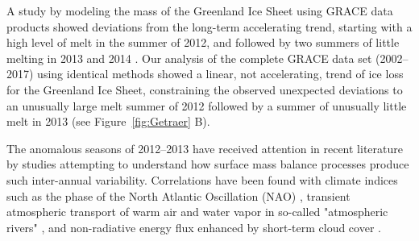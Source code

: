 \documentclass[11pt]{report}
\begin{document}

A study by \cite{Harig+2016} modeling the mass of the Greenland Ice Sheet
using GRACE data products showed deviations from the long-term accelerating
trend, starting with a high level of melt in the summer of 2012, and followed by two
summers of little melting in 2013 and 2014 \cite[see
Figure~\ref{fig:Getraer} A, comparable to][their
Figure~4]{Harig+2016}. Our analysis of the complete GRACE data set (2002--2017) using identical methods showed a linear,
not accelerating, trend of ice loss for the Greenland Ice Sheet, constraining the observed unexpected deviations to an unusually large melt summer of 2012 followed by a summer of unusually little melt in 2013 (see
Figure~\ref{fig:Getraer} B). 


The anomalous seasons of 2012--2013 have received attention in recent literature by studies attempting to understand how surface mass balance processes produce such inter-annual variability. Correlations have been found with climate indices such as the phase of the North Atlantic Oscillation (NAO) \cite[][]{mcmillan2016,bevis2019,getraerFall}, transient atmospheric transport of warm air and water vapor in so-called "atmospheric rivers" \citep{mattingly2018}, and non-radiative energy flux enhanced by short-term cloud cover \citep{solomon2017}. 
\end{document}
